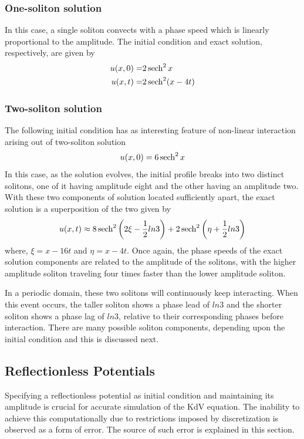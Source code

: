 \subsubsection{One-soliton solution} In this case, a single soliton convects with a phase speed which is linearly proportional to the amplitude. The initial condition and exact solution, respectively, are given by
\begin{align}
\label{eq:1solin}
u(x,0) = &2 \operatorname{sech}^2 x\\
\label{eq:1solex}
u(x,t) = &2 \operatorname{sech}^2(x-4t)
\end{align}

\subsubsection{Two-soliton solution} The following initial condition has as interesting feature of non-linear interaction arising out of two-soliton solution
\begin{equation}
\label{eq:2solin}
u(x,0) = 6 \operatorname{sech}^2 x
\end{equation}
In this case, as the solution evolves, the initial profile breaks into two distinct solitons, one of it having amplitude eight and the other having an amplitude two. With these two components of solution located sufficiently apart, the exact solution is a superposition of the two given by  
\begin{equation}
\label{eq:2solex}
u(x,t) \approx  8 \operatorname{sech}^2 \left(2\xi - \frac{1}{2} ln 3\right) + 2 \operatorname{sech}^2 \left(\eta + \frac{1}{2} ln 3\right)
\end{equation}
where, $\xi =x-16t$ and $\eta=x-4t$. Once again, the phase speeds of the exact solution components are related to the amplitude of the solitons, with the higher amplitude soliton traveling four times faster than the lower amplitude soliton.

In a periodic domain, these two solitons will continuously keep interacting. When this event occurs, the taller soliton shows a phase lead of $ln 3$ and the shorter soliton shows a phase lag of $ln 3$, relative to their corresponding phases before interaction. There are many possible soliton components, depending upon the initial condition and this is discussed next.

\subsection{Reflectionless Potentials}
\label{subsec:ref}
Specifying a reflectionless potential as initial condition and maintaining its amplitude is crucial for accurate simulation of the KdV equation. The inability to achieve this computationally due to restrictions imposed by discretization is observed as a form of error. The source of such error is explained in this section.

